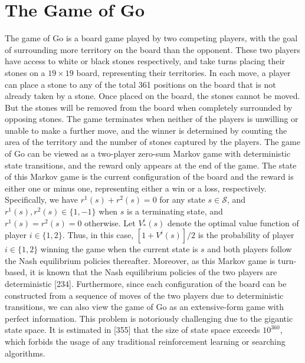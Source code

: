 \documentclass[10pt]{article}
\begin{document}
\section{The Game of Go}
The game of Go is a board game played by two competing players, with the goal of surrounding more territory on the board than the opponent. These two players have access to white or black stones respectively, and take turns placing their stones on a $19 \times 19$ board, representing their territories. In each move, a player can place a stone to any of the total 361 positions on the board that is not already taken by a stone. Once placed on the board, the stones cannot be moved. But the stones will be removed from the board when completely surrounded by opposing stones. The game terminates when neither of the players is unwilling or unable to make a further move, and the winner is determined by counting the area of the territory and the number of stones captured by the players. The game of Go can be viewed as a two-player zero-sum Markov game with deterministic state transitions, and the reward only appears at the end of the game. The state of this Markov game is the current configuration of the board and the reward is either one or minus one, representing either a win or a loss, respectively. Specifically, we have $r^{1}(s)+r^{2}(s)=0$ for any state $s \in \mathcal{S}$, and $r^{1}(s), r^{2}(s) \in\{1,-1\}$ when $s$ is a terminating state, and $r^{1}(s)=r^{2}(s)=0$ otherwise. Let $V_{*}^{i}(s)$ denote the optimal value function of player $i \in\{1,2\}$. Thus, in this case, $\left[1+V^{i}(s)\right] / 2$ is the probability of player $i \in\{1,2\}$ winning the game when the current state is $s$ and both players follow the Nash equilibrium policies thereafter. Moreover, as this Markov game is turn-based, it is known that the Nash equilibrium policies of the two players are deterministic [234]. Furthermore, since each configuration of the board can be constructed from a sequence of moves of the two players due to deterministic transitions, we can also view the game of Go as an extensive-form game with perfect information. This problem is notoriously challenging due to the gigantic state space. It is estimated in [355] that the size of state space exceeds $10^{360}$, which forbids the usage of any traditional reinforcement learning or searching algorithms.
\end{document}

